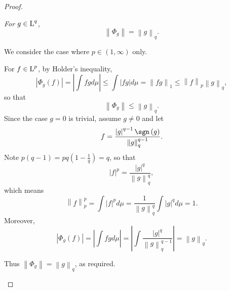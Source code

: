 \documentclass[pmath451]{subfiles}
\begin{document}
    \begin{proof}
        \begin{claim}
            \textit{For $g\in\operatorname{L}^q$,
                \begin{equation*}
                    \left\lVert \Phi_g\right\rVert = \left\lVert g\right\rVert_q.
                \end{equation*}
            }

            We consider the case where $p\in\left( 1,\infty \right)$ only.

            For $f\in\operatorname{L}^p$, by Holder's inequality,
            \begin{equation*}
                \left| \Phi_g\left( f \right) \right| = \left| \int fgd\mu \right| \leq \int\left| fg \right|d\mu = \left\lVert fg \right\rVert_{1} \leq \left\lVert f\right\rVert_p\left\lVert g\right\rVert_q,
            \end{equation*}
            so that
            \begin{equation*}
                \left\lVert \Phi_g\right\rVert \leq \left\lVert g\right\rVert_q.
            \end{equation*}
            Since the case $g=0$ is trivial, assume $g\neq 0$ and let
            \begin{equation*}
                f = \frac{\left| g \right|^{q-1}\sgn\left( g \right)}{\left\lVert g\right\rVert_q^{q-1}}.
            \end{equation*}
            Note $p\left( q-1 \right) = pq\left( 1-\frac{1}{q} \right) = q$, so that
            \begin{equation*}
                \left| f \right|^p = \frac{\left| g \right|^q}{\left\lVert g\right\rVert^{q}_q},
            \end{equation*}
            which means
            \begin{equation*}
                \left\lVert f\right\rVert^p_p = \int \left| f \right|^pd\mu = \frac{1}{\left\lVert g\right\rVert_q^q}\int\left| g \right|^qd\mu = 1.
            \end{equation*}
            Moreover,
            \begin{equation*}
                \left| \Phi_g\left( f \right) \right| = \left| \int fgd\mu \right| = \left| \int \frac{\left| g \right|^q}{\left\lVert g\right\rVert^{q-1}_q} \right| = \left\lVert g\right\rVert_q.
            \end{equation*}

            Thus $\left\lVert \Phi_g\right\rVert = \left\lVert g\right\rVert_q$, as required.
        \end{claim}


\end{proof}
\end{document}

